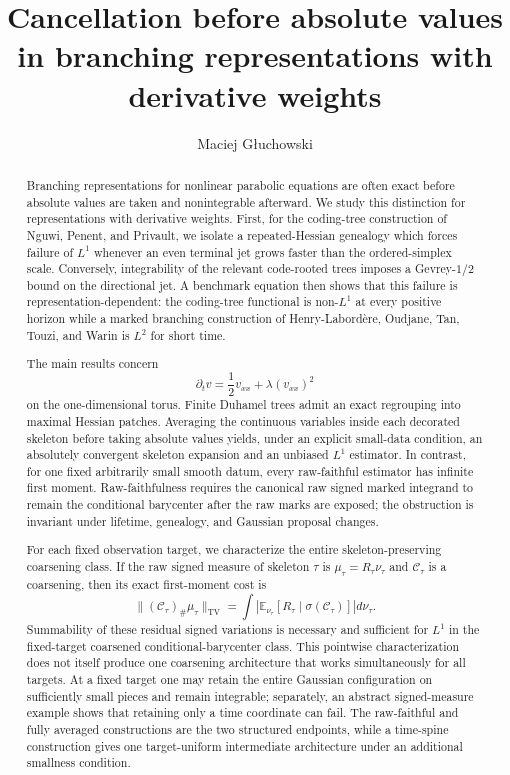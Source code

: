 \documentclass[11pt]{article}
\title{Cancellation before absolute values in branching representations with derivative weights}
\author{Maciej G{\l}uchowski}
\date{}
\begin{document}
\maketitle

\begin{abstract}
Branching representations for nonlinear parabolic equations are often exact before absolute values are taken and nonintegrable afterward. We study this distinction for representations with derivative weights. First, for the coding-tree construction of Nguwi, Penent, and Privault, we isolate a repeated-Hessian genealogy which forces failure of $L^1$ whenever an even terminal jet grows faster than the ordered-simplex scale. Conversely, integrability of the relevant code-rooted trees imposes a Gevrey-$1/2$ bound on the directional jet. A benchmark equation then shows that this failure is representation-dependent: the coding-tree functional is non-$L^1$ at every positive horizon while a marked branching construction of Henry-Labord\`ere, Oudjane, Tan, Touzi, and Warin is $L^2$ for short time.

The main results concern
\begin{equation*}
  \partial_t v=\frac12v_{xx}+\lambda(v_{xx})^2
\end{equation*}
on the one-dimensional torus. Finite Duhamel trees admit an exact regrouping into maximal Hessian patches. Averaging the continuous variables inside each decorated skeleton before taking absolute values yields, under an explicit small-data condition, an absolutely convergent skeleton expansion and an unbiased $L^1$ estimator. In contrast, for one fixed arbitrarily small smooth datum, every raw-faithful estimator has infinite first moment. Raw-faithfulness requires the canonical raw signed marked integrand to remain the conditional barycenter after the raw marks are exposed; the obstruction is invariant under lifetime, genealogy, and Gaussian proposal changes.

For each fixed observation target, we characterize the entire skeleton-preserving coarsening class. If the raw signed measure of skeleton $\tau$ is $\mu_\tau=R_\tau\nu_\tau$ and $\mathcal C_\tau$ is a coarsening, then its exact first-moment cost is
\begin{equation*}
  \| (\mathcal C_\tau)_\#\mu_\tau\|_{\mathrm{TV}}
  =
  \int
  \left|
    \mathbb E_{\nu_\tau}
    [R_\tau\mid\sigma(\mathcal C_\tau)]
  \right|d\nu_\tau.
\end{equation*}
Summability of these residual signed variations is necessary and sufficient for $L^1$ in the fixed-target coarsened conditional-barycenter class. This pointwise characterization does not itself produce one coarsening architecture that works simultaneously for all targets. At a fixed target one may retain the entire Gaussian configuration on sufficiently small pieces and remain integrable; separately, an abstract signed-measure example shows that retaining only a time coordinate can fail. The raw-faithful and fully averaged constructions are the two structured endpoints, while a time-spine construction gives one target-uniform intermediate architecture under an additional smallness condition.
\end{abstract}
\end{document}
